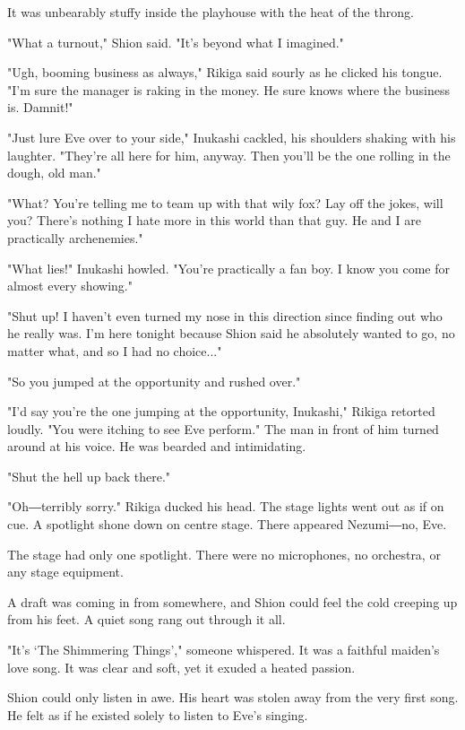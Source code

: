 \myspace

It was unbearably stuffy inside the playhouse with the heat of the throng.

"What a turnout," Shion said. "It's beyond what I imagined."

"Ugh, booming business as always," Rikiga said sourly as he clicked his tongue. "I'm sure the manager is raking in the money. He sure knows where the business is. Damnit!"

"Just lure Eve over to your side," Inukashi cackled, his shoulders shaking with his laughter. "They're all here for him, anyway. Then you'll be the one rolling in the dough, old man."

"What? You're telling me to team up with that wily fox? Lay off the jokes, will you? There's nothing I hate more in this world than that guy. He and I are practically archenemies."

"What lies!" Inukashi howled. "You're practically a fan boy. I know you come for almost every showing."

"Shut up! I haven't even turned my nose in this direction since finding out who he really was. I'm here tonight because Shion said he absolutely wanted to go, no matter what, and so I had no choice..."

"So you jumped at the opportunity and rushed over."

"I'd say you're the one jumping at the opportunity, Inukashi," Rikiga retorted loudly. "You were itching to see Eve perform." The man in front of him turned around at his voice. He was bearded and intimidating.

"Shut the hell up back there."

"Oh―terribly sorry." Rikiga ducked his head. The stage lights went out as if on cue. A spotlight shone down on centre stage. There appeared Nezumi―no, Eve.

The stage had only one spotlight. There were no microphones, no orchestra, or any stage equipment.

A draft was coming in from somewhere, and Shion could feel the cold creeping up from his feet. A quiet song rang out through it all.

"It's ‘The Shimmering Things'," someone whispered. It was a faithful maiden's love song. It was clear and soft, yet it exuded a heated passion.

Shion could only listen in awe. His heart was stolen away from the very first song. He felt as if he existed solely to listen to Eve's singing.

